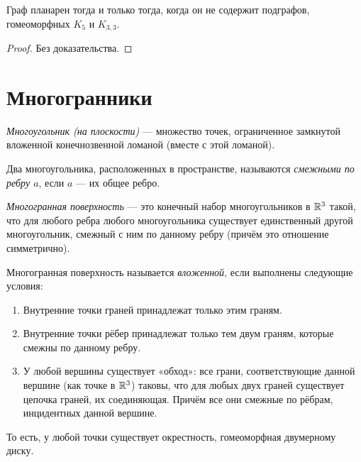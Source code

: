 \begin{theorem}
    Граф планарен тогда и только тогда, когда он не содержит подграфов, гомеоморфных $K_5$ и $K_{3,3}$.
\end{theorem}
\begin{proof}
    Без доказательства.
\end{proof}

\newpage
\section{Многогранники}
\begin{definition}
    \textit{Многоугольник (на плоскости)} — множество точек, ограниченное замкнутой вложенной конечнозвенной ломаной (вместе с этой ломаной).
\end{definition}

\begin{definition}
    Два многоугольника, расположенных в пространстве, называются \textit{смежными по ребру $a$}, если $a$ — их общее ребро. %
\end{definition}

\begin{definition}
    \textit{Многогранная поверхность} — это конечный набор многоугольников в $\mathbb{R}^3$ такой, что для любого ребра любого многоугольника существует единственный другой многоугольник, смежный с ним по данному ребру (причём это отношение симметрично).
\end{definition}

\begin{definition}
    Многогранная поверхность называется \textit{вложенной}, если выполнены следующие условия:
    \begin{enumerate}
        \item Внутренние точки граней принадлежат только этим граням.
        \item Внутренние точки рёбер принадлежат только тем двум граням, которые смежны по данному ребру.
        \item У любой вершины существует «обход»: все грани, соответствующие данной вершине (как точке в $\mathbb{R}^3$) таковы, что для любых двух граней существует цепочка граней, их соединяющая. Причём все они смежные по рёбрам, инцидентных данной вершине.
    \end{enumerate}
    То есть, у любой точки существует окрестность, гомеоморфная двумерному диску.
\end{definition}

